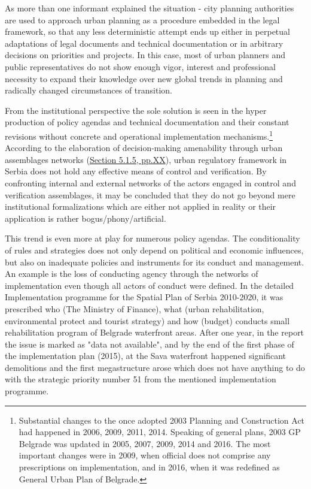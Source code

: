 \documentclass[11pt]{report}
\begin{document}
As more than one informant explained the situation - city planning authorities are used to approach urban planning as a procedure embedded in the legal framework, so that any less deterministic attempt ends up either in perpetual adaptations of legal documents and technical documentation or in arbitrary decisions on priorities and projects.
In this case, most of urban planners and public representatives do not show enough vigor, interest and professional necessity to expand their knowledge over new global trends in planning and radically changed circumstances of transition.

From the institutional perspective the sole solution is seen in the hyper production of policy agendas and technical documentation and their constant revisions without concrete and operational implementation mechanisms.\footnote{
Substantial changes to the once adopted 2003 Planning and Construction Act had happened in 2006, 2009, 2011, 2014.
Speaking of general plans, 2003 GP Belgrade was updated in 2005, 2007, 2009, 2014 and 2016.
The most important changes were in 2009, when official does not comprise any prescriptions on implementation, and in 2016, when it was redefined as General Urban Plan of Belgrade.}
According to the elaboration of decision-making amenability through urban assemblages networks (\href{}{Section 5.1.5, pp.XX}), urban regulatory framework in Serbia does not hold any effective means of control and verification.
By confronting internal and external networks of the actors engaged in control and verification assemblages, it may be concluded that they do not go beyond mere institutional formalizations which are either not applied in reality or their application is rather bogus/phony/artificial.

This trend is even more at play for numerous policy agendas.
The conditionality of rules and strategies does not only depend on political and economic influences, but also on inadequate policies and instruments for its conduct and management.
An example is the loss of conducting agency through the networks of implementation even though all actors of conduct were defined. In the detailed Implementation programme for the Spatial Plan of Serbia 2010-2020, it was prescribed who (The Ministry of Finance), what (urban rehabilitation, environmental protect and tourist strategy) and how (budget) conducts small rehabilitation program of Belgrade waterfront areas.
After one year, in the report the issue is marked as "data not available", and by the end of the first phase of the implementation plan (2015), at the Sava waterfront happened significant demolitions and the first megastructure arose which does not have anything to do with the strategic priority number 51 from the mentioned implementation programme.
\end{document}
